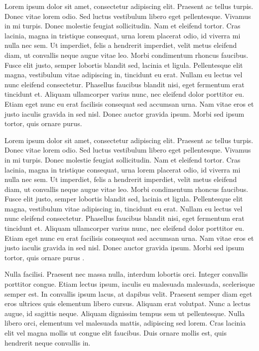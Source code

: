 \documentclass[bsc, classic, a4paper]{ufbathesis}
\begin{document}
Lorem ipsum dolor sit amet, consectetur adipiscing elit. Praesent ac tellus turpis. Donec vitae lorem odio. Sed luctus vestibulum libero eget pellentesque. Vivamus in mi turpis. Donec molestie feugiat sollicitudin. Nam et eleifend tortor. Cras lacinia, magna in tristique consequat, urna lorem placerat odio, id viverra mi nulla nec sem. Ut imperdiet, felis a hendrerit imperdiet, velit metus eleifend diam, ut convallis neque augue vitae leo. Morbi condimentum rhoncus faucibus. Fusce elit justo, semper lobortis blandit sed, lacinia et ligula. Pellentesque elit magna, vestibulum vitae adipiscing in, tincidunt eu erat. Nullam eu lectus vel nunc eleifend consectetur. Phasellus faucibus blandit nisi, eget fermentum erat tincidunt et. Aliquam ullamcorper varius nunc, nec eleifend dolor porttitor eu. Etiam eget nunc eu erat facilisis consequat sed accumsan urna. Nam vitae eros et justo iaculis gravida in sed nisl. Donec auctor gravida ipsum. Morbi sed ipsum tortor, quis ornare purus.



Lorem ipsum dolor sit amet, consectetur adipiscing elit. Praesent ac tellus turpis. Donec vitae lorem odio. Sed luctus vestibulum libero eget pellentesque. Vivamus in mi turpis. Donec molestie feugiat sollicitudin. Nam et eleifend tortor. Cras lacinia, magna in tristique consequat, urna lorem placerat odio, id viverra mi nulla nec sem. Ut imperdiet, felis a hendrerit imperdiet, velit metus eleifend diam, ut convallis neque augue vitae leo. Morbi condimentum rhoncus faucibus. Fusce elit justo, semper lobortis blandit sed, lacinia et ligula. Pellentesque elit magna, vestibulum vitae adipiscing in, tincidunt eu erat. Nullam eu lectus vel nunc eleifend consectetur. Phasellus faucibus blandit nisi, eget fermentum erat tincidunt et. Aliquam ullamcorper varius nunc, nec eleifend dolor porttitor eu. Etiam eget nunc eu erat facilisis consequat sed accumsan urna. Nam vitae eros et justo iaculis gravida in sed nisl. Donec auctor gravida ipsum. Morbi sed ipsum tortor, quis ornare purus \cite{demeyer2008}.

Nulla facilisi. Praesent nec massa nulla, interdum lobortis orci. Integer convallis porttitor congue. Etiam lectus ipsum, iaculis eu malesuada malesuada, scelerisque semper est. In convallis ipsum lacus, at dapibus velit. Praesent semper diam eget eros ultrices quis elementum libero cursus. Aliquam erat volutpat. Nunc a lectus augue, id sagittis neque. Aliquam dignissim tempus sem ut pellentesque. Nulla libero orci, elementum vel malesuada mattis, adipiscing sed lorem. Cras lacinia elit vel magna mollis ut congue elit faucibus. Duis ornare mollis est, quis hendrerit neque convallis in.
\end{document}
